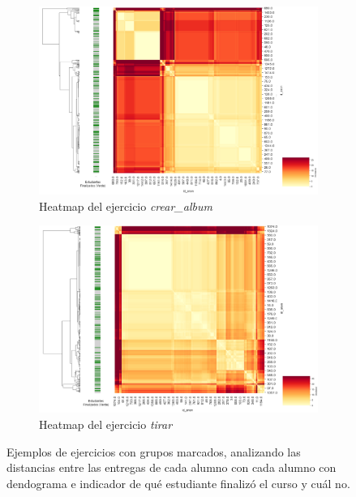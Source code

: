 \documentclass[11pt,a4paper,twoside,openany]{tesis}
\begin{document}
\begin{figure}[H]
    \centering
    \begin{subfigure}{0.45\textwidth}
        \includegraphics[width=\linewidth]{imagenes/heatmap-2-crear album.png}
        \caption{Heatmap del ejercicio \emph{crear\_album}}
        \label{fig:figura1}
    \end{subfigure}
    \hfill
    \begin{subfigure}{0.45\textwidth}
        \includegraphics[width=\linewidth]{imagenes/heatmap-2-tirar.png}
        \caption{Heatmap del ejercicio \emph{tirar}}
        \label{fig:figura2}
    \end{subfigure}
    \caption{Ejemplos de ejercicios con grupos marcados, analizando las distancias entre las entregas de cada alumno con cada alumno con dendograma e indicador de qué estudiante finalizó el curso y cuál no.}
    \label{fig:figuras_juntas_tres}
\end{figure}
\end{document}
